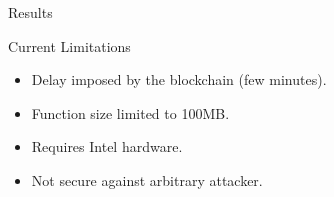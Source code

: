 \documentclass[final]{beamer}
\newlength{\onecolwid}
\begin{document}
\begin{frame}[t]
\begin{columns}[t]
\begin{column}{\onecolwid}
\begin{alertblock}{Results}
\end{alertblock}


\begin{block}{Current Limitations}
\begin{itemize}
 \item Delay imposed by the blockchain (few minutes).
 \item Function size limited to 100MB. 
 \item Requires Intel hardware. 
 \item Not secure against arbitrary attacker. 
\end{itemize}

\end{block}


\end{column} %

\end{columns} %

\end{frame} %
\end{document}
